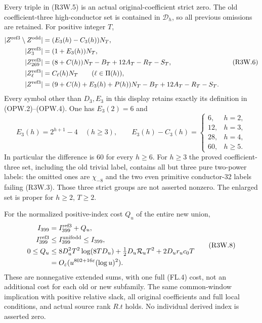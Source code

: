 \begin{theorem}
\label{AC-G179-window}
Every triple in (R3W.5) is an actual original-coefficient strict zero.
The old coefficient-three high-conductor set is contained in
$\mathscr D_h$, so all previous omissions are retained.
For positive integer $T$,
\[
 \begin{aligned}
 |Z^{\rm ref3}\setminus Z^{\rm odd}|
                    &=(E_3(h)-C_3(h))N_T,\\
 |Z^{\rm ref3}_3|&=(1+E_3(h))N_T,\\
 |Z^{\rm ref3}_{269}|&=(8+C(h))N_T-B_T+12A_T-R_T-S_T,\\
 |Z^{\rm ref3}_\ell|&=C_\ell(h)N_T\qquad(\ell\in\Pi(h)),\\
 |Z^{\rm ref3}|&=(9+C(h)+E_3(h)+P(h))N_T
                                  -B_T+12A_T-R_T-S_T.
 \end{aligned}\tag{R3W.6}
\]
Every symbol other than $D_3,E_3$ in this display retains exactly
its definition in (OPW.2)--(OPW.4).
One has $E_3(2)=6$ and
\[
 E_3(h)=2^{h+1}-4\quad(h\geq3),\qquad
 E_3(h)-C_3(h)=
 \begin{cases}6,&h=2,\\12,&h=3,\\28,&h=4,\\60,&h\geq5.
 \end{cases}\tag{R3W.7}
\]
In particular the difference is $60$ for every $h\geq6$.
For $h\geq3$ the proved coefficient-three set, including the
old trivial label, contains all but three pure two-power labels:
the omitted ones are $\chi_{-8}$ and the two even primitive
conductor-32 labels failing (R3W.3).
Those three strict groups are not asserted nonzero.
The enlarged set is proper for $h\geq2$, $T\geq2$.

For the normalized positive-index cost $Q_u$ of the entire new union,
\[
 \begin{aligned}
 I_{399}&=I_{399}^{\rm ref3}+Q_u,\\
 I_{399}^{\rm ref3}&\leq I_{399}^{\rm unifodd}\leq I_{399},\\
 0\leq Q_u&\leq8D_u^2T^2\log(8TD_u)
                +\tfrac12D_u\mathcal R_uT^2+2D_ur_uc_0T\\
 &=O_\varepsilon(u^{802+16\varepsilon}(\log u)^2).
 \end{aligned}\tag{R3W.8}
\]
These are nonnegative extended sums, with one full (FL.4) cost,
not an additional cost for each old or new subfamily.
The same common-window implication with positive relative slack,
all original coefficients and full local conditions, and actual
source rank $R.t$ holds.  No individual derived index is asserted zero.
\end{theorem}

